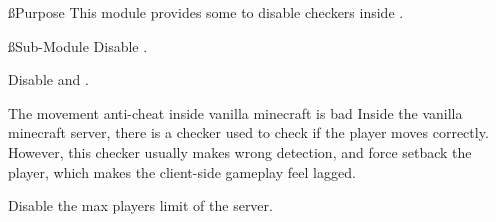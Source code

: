 \ss{Purpose}
This module provides some  to disable checkers inside .

\ss{Sub-Module}
Disable .

Disable  and .

\begin{warn}{The movement anti-cheat inside vanilla minecraft is bad}
    Inside the vanilla minecraft server, there is a checker used to check if the player moves correctly.
    However, this checker usually makes wrong detection, and force setback the player, which makes the client-side gameplay feel lagged.
\end{warn}

Disable the max players limit of the server.